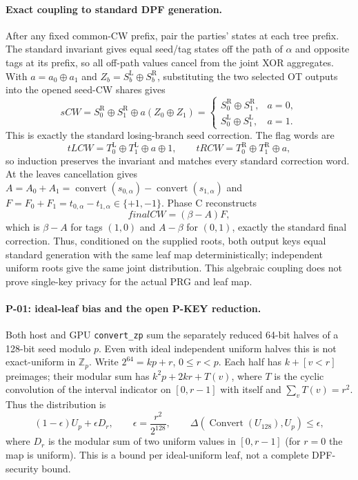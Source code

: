 \documentclass[11pt]{article}
\newcommand{\Z}{\mathbb{Z}}
\begin{document}
\paragraph{Exact coupling to standard DPF generation.}
After any fixed common-CW prefix, pair the parties' states at each tree prefix.
The standard invariant gives equal seed/tag states off the path of $\alpha$
and opposite tags at its prefix, so all off-path values cancel from the joint
XOR aggregates. With $a=a_0\oplus a_1$ and
$Z_b=S_b^{\mathrm L}\oplus S_b^{\mathrm R}$, substituting the two selected OT
outputs into the opened seed-CW shares gives
\[
\mathit{sCW}=
S_0^{\mathrm R}\oplus S_1^{\mathrm R}\oplus
a(Z_0\oplus Z_1)
=
\begin{cases}
S_0^{\mathrm R}\oplus S_1^{\mathrm R},&a=0,\\
S_0^{\mathrm L}\oplus S_1^{\mathrm L},&a=1.
\end{cases}
\]
This is exactly the standard losing-branch seed correction. The flag words are
\[
\mathit{tLCW}=T_0^{\mathrm L}\oplus T_1^{\mathrm L}\oplus a\oplus1,
\qquad
\mathit{tRCW}=T_0^{\mathrm R}\oplus T_1^{\mathrm R}\oplus a,
\]
so induction preserves the invariant and matches every standard correction
word. At the leaves cancellation gives
$A=A_0+A_1=\operatorname{convert}(s_{0,\alpha})-\operatorname{convert}(s_{1,\alpha})$ and
$F=F_0+F_1=t_{0,\alpha}-t_{1,\alpha}\in\{+1,-1\}$. Phase C reconstructs
\[
\mathit{finalCW}=(\beta-A)F,
\]
which is $\beta-A$ for tags $(1,0)$ and $A-\beta$ for $(0,1)$, exactly the
standard final correction. Thus, conditioned on the supplied roots, both
output keys equal standard generation with the same leaf map deterministically;
independent uniform roots give the same joint distribution. This algebraic
coupling does not prove single-key privacy for the actual PRG and leaf map.

\paragraph{P-01: ideal-leaf bias and the open P-KEY reduction.}
Both host and GPU \texttt{convert\_zp} sum the separately reduced 64-bit
halves of a 128-bit seed modulo $p$. Even with ideal independent uniform
halves this is not exact-uniform in $\Z_p$. Write $2^{64}=kp+r$,
$0\le r<p$. Each half has $k+[v<r]$ preimages; their modular sum has
$k^2p+2kr+T(v)$, where $T$ is the cyclic convolution of the interval
indicator on $[0,r-1]$ with itself and $\sum_vT(v)=r^2$.
Thus the distribution is
\[
 (1-\epsilon)U_p+\epsilon D_r,\qquad
 \epsilon=\frac{r^2}{2^{128}},\qquad
 \Delta(\operatorname{Convert}(U_{128}),U_p)\le\epsilon,
\]
where $D_r$ is the modular sum of two uniform values in $[0,r-1]$
(for $r=0$ the map is uniform). This is a bound per ideal-uniform leaf,
not a complete DPF-security bound.
\end{document}
